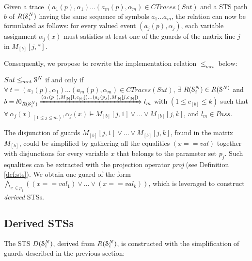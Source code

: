 Given a trace $(a_1(p), \alpha_1) \dots (a_m(p), \alpha_m) \in
CTraces({Sut})$ and a STS path $b$ of $R(\EuScript{S}_i^{N})$
having the same sequence of symbols $a_1 \dots a_m$, the relation
can now be formulated as follows: for every valued event
$(a_j(p), \alpha_j)$, each variable assignment $\alpha_j(x)$ must
satisfies at least one of the guards of the matrix line $j$ in
$M_{[b]}[j,*]$.

Consequently, we propose to rewrite the implementation relation
$\leq_{mct}$ below:

\begin{proposition}
    ${Sut} \leq_{mct} \EuScript{S}^{N}$ if and only if
    $\forall ~t = (a_1(p), \alpha_1) \dots (a_m(p), \alpha_m) \in
    CTraces({Sut})$, $\exists ~R(\EuScript{S}_i^{N}) \in
    R(\EuScript{S}^{N)}$ and
    $b = l0_{R(\EuScript{S}_i^{N})}
    \xRightarrow{(a_1(p_1),M_{[b]}[1,c_{[b]}]) \dots (a_j(p_j),M_{[b]}[j,c_{[b]}])}
    l_m$
    with $(1 \leq c_{[b]} \leq k)$ such that $\forall
    ~\alpha_j(x)_{(1 \leq j \leq m)}, \alpha_j(x) \models
    M_{[b]}[j,1] \vee \dots \vee  M_{[b]}[j,k]$, and $l_m \in Pass$.
\end{proposition}

The disjunction of guards $M_{[b]}[j,1] \vee \dots \vee
M_{[b]}[j,k]$, found in the matrix $M_{[b]}$, could be simplified
by gathering all the equalities $(x == val)$ together with
disjunctions for every variable $x$ that belongs to the parameter
set $p_j$. Such equalities can be extracted with the projection
operator \textit{proj} (see Definition \ref{def:sts}). We obtain
one guard of the form $\displaystyle \bigwedge_{x \in p_j} ((x ==
val_1) \vee \dots \vee (x == val_k))$, which is leveraged to
construct \emph{derived} STSs.

\subsection{Derived STSs}

The STS $D(\EuScript{S}_i^{N})$, derived from
$R(\EuScript{S}_i^{N})$, is constructed with the simplification
of guards described in the previous section:

